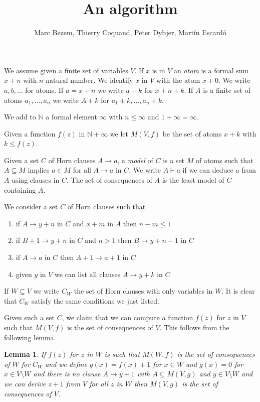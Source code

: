 \documentclass[11pt,a4paper]{article}
\newtheorem{lemma}{Lemma}[theorem]
\newcommand{\nats}{\mathbb{N}}
\begin{document}
\title{An algorithm}

\author{Marc Bezem, Thierry Coquand, Peter Dybjer, Mart\'in Escard\'o}
\date{}
\maketitle



We assume given a finite set of variables $V$. If $x$ is in $V$
an {\em atom} is a formal sum $x+n$ with $n$ natural number. We identify
$x$ in $V$ with the atom $x+0$. We write $a,b,\dots$ for atoms.
If $a = x+n$ we write $a+k$ for $x+n+k$. If $A$ is a finite set of atoms $a_1,\dots,a_n$
we write $A+k$ for $a_1+k,\dots, a_n+k$.

 We add to $\nats$ a formal element $\infty$ with $n\leqslant \infty$ and $1+\infty = \infty$.

 Given a function $f(z)$ in $\nats + \infty$ we let $M(V,f)$ be the set of atoms
 $x+k$ with $k\leqslant f(z)$.

 Given a set $C$ of Horn clauses $A\rightarrow a$, a {\em model} of $C$ is
a set $M$ of atoms such that $A\subseteq M$ implies $a\in M$ for all $A\rightarrow a$
in $C$. We write $A\vdash a$ if we can deduce $a$ from $A$ using clauses in $C$.
The set of consequences of $A$ is the least model of $C$ containing $A$.

 We consider a set $C$ of Horn clauses such that
\begin{enumerate}
\item if $A\rightarrow y+n$ in $C$ and $x+m$ in $A$ then $n-m\leqslant 1$
\item if $B+1\rightarrow y+n$ in $C$ and $n>1$ then $B\rightarrow y+n-1$ in $C$
\item if $A\rightarrow a$ in $C$ then $A+1\rightarrow a+1$ in $C$
\item given $y$ in $V$ we can list all clauses $A\rightarrow y+k$ in $C$  
\end{enumerate}  

If $W\subseteq V$ we write $C_W$ the set of Horn clauses with only variables in $W$.
It is clear that $C_W$ satisfy the same conditions we just listed.

Given such a set $C$, we claim that we can compute a function $f(z)$ for $z$ in $V$
such that $M(V,f)$ is the set of consequences of $V$. This follows from the following lemma.


\begin{lemma}
  If $f(z)$ for $z$ in $W$ is such that $M(W,f)$ is the set of consequences of $W$ for $C_W$
  and we define $g(x) = f(x)+1$ for $x\in W$ and $g(x) = 0$ for $x\in V\setminus W$
  and there is no clause $A\rightarrow y+1$ with $A\subseteq M(V,g)$ and $y\in V\setminus W$
  and we can derive $z+1$ from $V$ for all $z$ in $W$
  then $M(V,g)$ is the set of consequences of $V$. 
\end{lemma}  
 
\end{document}

